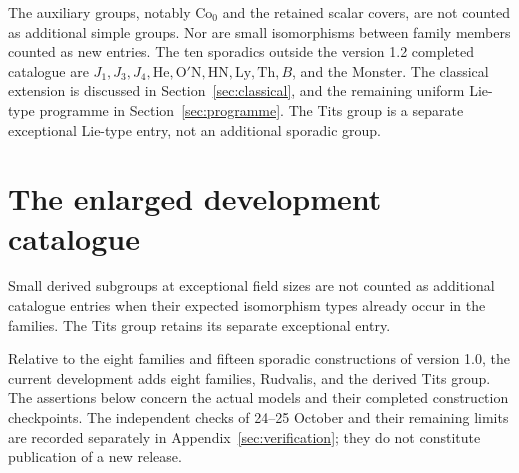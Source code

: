 \documentclass[11pt]{article}
\numberwithin{equation}{section}
\theoremstyle{definition}
\newcommand{\Co}{\mathrm{Co}}
\begin{document}
The auxiliary groups, notably $\Co_0$ and the retained scalar covers,
are not counted as additional simple groups. Nor are small isomorphisms
between family members counted as new entries. The ten sporadics outside the version 1.2 completed catalogue are
$J_1,J_3,J_4,\mathrm{He},\mathrm{O}'\mathrm{N},
\mathrm{HN},\mathrm{Ly},\mathrm{Th},B$, and the Monster.
The classical extension is discussed in Section~\ref{sec:classical},
and the remaining uniform Lie-type programme in Section~\ref{sec:programme}. The Tits group is a separate exceptional Lie-type entry,
not an additional sporadic group.


\section{The enlarged development catalogue}\label{sec:v12}
Small derived subgroups at exceptional field sizes are not counted as additional catalogue entries when their expected isomorphism types already occur in the families. The Tits group retains its separate exceptional entry.

Relative to the eight families and fifteen sporadic constructions of
version 1.0, the current development adds eight families, Rudvalis, and
the derived Tits group. The assertions below concern the actual models
and their completed construction checkpoints. The independent checks of
24--25 October and their remaining limits are recorded separately in
Appendix~\ref{sec:verification}; they do not constitute publication of a
new release.
\end{document}
